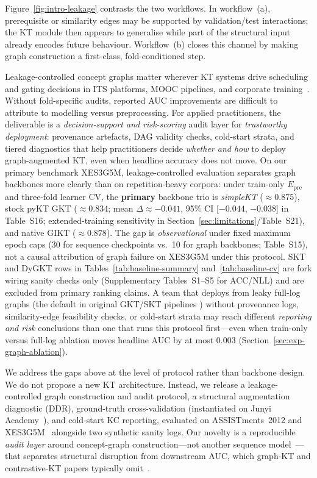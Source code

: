 \documentclass[pdflatex,sn-mathphys-num]{sn-jnl}
\newcommand{\Epre}{\ensuremath{E_{\text{pre}}}}
\newcommand{\DDR}{\textsc{DDR}}
\newcommand{\GKTdeltaci}{[$-0.044$, $-0.038$]}
\begin{document}
Figure~\ref{fig:intro-leakage} contrasts the two workflows. In
workflow~(a), prerequisite or similarity edges may be supported by
validation/test interactions; the KT module then appears to generalise
while part of the structural input already encodes future behaviour.
Workflow~(b) closes this channel by making graph construction a
first-class, fold-conditioned step.

Leakage-controlled concept graphs matter wherever KT systems drive
scheduling and gating decisions in ITS platforms, MOOC pipelines, and
corporate training~\cite{heffernan2006assist,junyi_dataset,choi2020ednet,xes3g5m2023}.
Without fold-specific audits, reported AUC improvements are difficult to
attribute to modelling versus preprocessing. For applied practitioners, the deliverable is a \emph{decision-support and
risk-scoring} audit layer for \emph{trustworthy deployment}: provenance
artefacts, DAG validity checks, cold-start strata, and tiered diagnostics that
help practitioners decide \emph{whether and how} to deploy graph-augmented KT,
even when headline accuracy does not move. On our primary benchmark XES3G5M, leakage-controlled
evaluation separates graph backbones more clearly than on repetition-heavy
corpora: under train-only $\Epre$ and three-fold learner CV, the
\textbf{primary} backbone trio is \textit{simpleKT} (${\approx}0.875$),
stock pyKT GKT (${\approx}0.834$; mean $\Delta{\approx}{-}0.041$, 95\% CI
\GKTdeltaci{} in Table~S16; extended-training sensitivity in
Section~\ref{sec:limitations}/Table~S21),
and native GIKT (${\approx}0.878$). The gap is
\emph{observational} under fixed maximum epoch caps (30 for sequence checkpoints
vs.\ 10 for graph backbones; Table~S15), not a causal attribution of graph
failure on XES3G5M under this protocol. SKT and DyGKT rows in
Tables~\ref{tab:baseline-summary} and~\ref{tab:baseline-cv} are fork wiring
sanity checks only (Supplementary Tables~S1--S5 for ACC/NLL) and are excluded
from primary ranking claims. A team that
deploys from leaky full-log graphs (the default in original GKT/SKT pipelines
\cite{nakagawa2019gkt,tong2020skt}) without provenance logs, similarity-edge
feasibility checks, or cold-start strata may reach different \emph{reporting
and risk} conclusions than one that runs this protocol first---even when
train-only versus full-log ablation moves headline AUC by at most $0.003$
(Section~\ref{sec:exp-graph-ablation}).

We address the gaps above at the level of protocol rather than backbone
design. We do not propose a new KT architecture. Instead, we release a
leakage-controlled graph construction and audit protocol, a structural
augmentation diagnostic (\DDR{}), ground-truth cross-validation
(instantiated on Junyi Academy~\cite{junyi_dataset,chang2015junyi}),
and cold-start KC reporting, evaluated on ASSISTments~2012 and
XES3G5M~\cite{xes3g5m2023} alongside two synthetic sanity logs. Our
novelty is a reproducible \emph{audit layer} around concept-graph
construction---not another sequence model~\cite{abdelrahman2023kt_survey,liu2022pykt}---that
separates structural disruption from downstream AUC, which graph-KT and
contrastive-KT papers typically omit~\cite{nakagawa2019gkt,lee2022cl4kt}.
\end{document}
